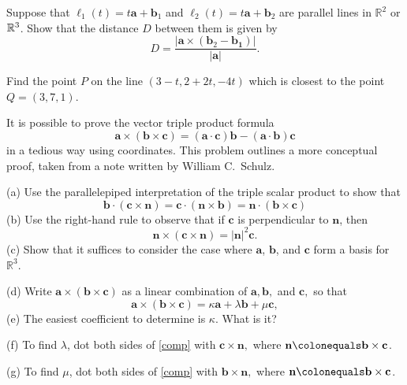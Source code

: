 \documentclass{watsonbook}
\begin{document}
\begin{aexercise}
  Suppose that $\ell_1(t)=t\mathbf{a}+\mathbf{b}_1$ and $\ell_2(t)=t\mathbf{a}+\mathbf{b}_2$ are parallel lines in $\mathbb{R}^2$ or $\mathbb{R}^3$. Show that the distance $D$ between them is given by 
\[
D = \frac{|\mathbf{a}\times(\mathbf{b}_2-\mathbf{b_1})|}{|\mathbf{a}|}. 
\]
\end{aexercise}

\begin{aexercise}
  Find the point $P$ on the line $(3-t,2+2t,-4t)$ which is closest to the point $Q=(3,7,1)$.
\end{aexercise}

\begin{aexercise}%
  It is possible to prove the vector triple product formula
  \[
    \mathbf{a}\times(\mathbf{b}\times\mathbf{c}) =
    (\mathbf{a}\cdot\mathbf{c})\mathbf{b} -
    (\mathbf{a}\cdot\mathbf{b})\mathbf{c}
  \]
  in a tedious way using coordinates. This problem outlines a more
  conceptual proof, taken from a note written by William C.\ Schulz.

  (a) Use the parallelepiped interpretation of the triple scalar
  product to show that
  \[
    \mathbf{b}\cdot(\mathbf{c}\times\mathbf{n}) =
    \mathbf{c}\cdot(\mathbf{n}\times\mathbf{b}) =
    \mathbf{n}\cdot(\mathbf{b}\times\mathbf{c})
  \]
  (b) Use the right-hand rule to observe that if $\mathbf{c}$ is
  perpendicular to $\mathbf{n}$, then
  \[
    \mathbf{n}\times(\mathbf{c}\times\mathbf{n}) =
    |\mathbf{n}|^2\mathbf{c}.
  \]
  (c) Show that it suffices to consider the case where $\mathbf{a}$,
  $\mathbf{b}$, and $\mathbf{c}$ form a basis for $\mathbb{R}^3$.

  (d) Write $\mathbf{a}\times(\mathbf{b}\times\mathbf{c})$ as a linear
  combination of $\mathbf{a}, \mathbf{b},$ and $\mathbf{c},$ so that
  \begin{equation} \label{comp}
    \mathbf{a}\times(\mathbf{b}\times\mathbf{c}) = \kappa
    \mathbf{a}+\lambda \mathbf{b}+\mu\mathbf{c},
  \end{equation} 
  (e) The easiest coefficient to determine is $\kappa$. What is it?

  (f) To find $\lambda$, dot both sides of \eqref{comp} with
  $\mathbf{c}\times \mathbf{n},$ where
  $\mathbf{n}\colonequals \mathbf{b}\times\mathbf{c}$.

  (g) To find $\mu$, dot both sides of \eqref{comp} with
  $\mathbf{b}\times \mathbf{n},$ where
  $\mathbf{n}\colonequals \mathbf{b}\times\mathbf{c}$.
\end{aexercise}
\end{document}
